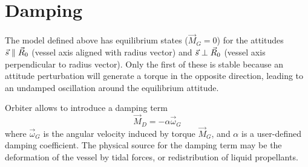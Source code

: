 \documentclass[a4paper]{article}
\begin{document}
\section{Damping}
The model defined above has equilibrium states ($\vec{M}_G = 0$) for the attitudes $\vec{s} \parallel \vec{R}_{0}$ (vessel axis aligned with radius vector) and $\vec{s} \perp \vec{R}_{0}$ (vessel axis perpendicular to radius vector). Only the first of these is stable because an attitude perturbation will generate a torque in the opposite direction, leading to an undamped oscillation around the equilibrium attitude.

Orbiter allows to introduce a damping term
\begin{equation*}
\vec{M}_D = -\alpha\vec{\omega}_G
\end{equation*}
where $\vec{\omega}_G$ is the angular velocity induced by torque $\vec{M}_G$, and $\alpha$ is a user-defined damping coefficient. The physical source for the damping term may be the deformation of the vessel by tidal forces, or redistribution of liquid propellants.


\end{document}
